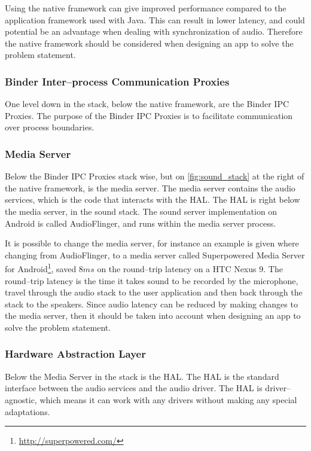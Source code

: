 Using the native framework can give improved performance compared to the application framework used with Java\cite{nat_perf_2}.
This can result in lower latency, and could potential be an advantage when dealing with synchronization of audio.
Therefore the native framework should be considered when designing an app to solve the problem statement.

\subsubsection{Binder Inter--process Communication Proxies}
One level down in the stack, below the native framework, are the Binder \ac{IPC} Proxies.
The purpose of the Binder \ac{IPC} Proxies is to facilitate communication over process boundaries.

\subsubsection{Media Server}
Below the Binder \ac{IPC} Proxies stack wise, but on \cref{fig:sound_stack} at the right of the native framework, is the media server.
The media server contains the audio services, which is the code that interacts with the \ac{HAL}.
The \ac{HAL} is right below the media server, in the sound stack.
The sound server implementation on Android is called AudioFlinger, and runs within the media server process\cite{audioflinger}.

It is possible to change the media server,
for instance an example is given where changing from AudioFlinger, to a media server called Superpowered Media Server for Android\footnote{\url{http://superpowered.com/}}, saved $8 ms$ on the round--trip latency on a HTC Nexus 9\cite{superpowered_8ms}.
The round--trip latency is the time it takes sound to be recorded by the microphone,
travel through the audio stack to the user application and then back through the stack to the speakers\cite{superpowered_8ms}.
Since audio latency can be reduced by making changes to the media server,
then it should be taken into account when designing an app to solve the problem statement.

\subsubsection{Hardware Abstraction Layer}
Below the Media Server in the stack is the \ac{HAL}.
The \ac{HAL} is the standard interface between the audio services and the audio driver.
The \ac{HAL} is driver--agnostic, which means it can work with any drivers without making any special adaptations.

